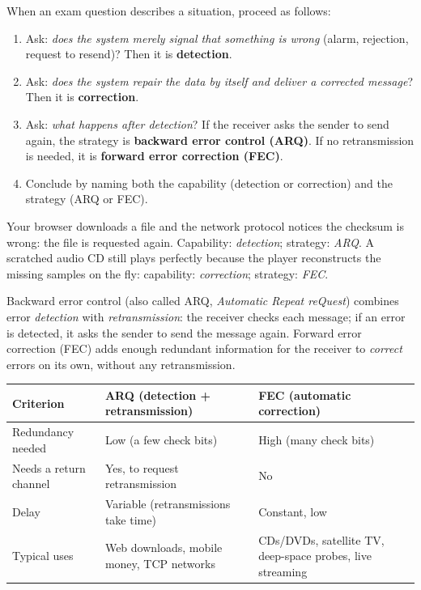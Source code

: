 \documentclass[11pt]{article}
\newcommand{\cle}[1]{{\popxbold\color{popdark}#1}}
\newcounter{popsec}
\newcounter{popsub}
\newcommand{\courssub}[1]{%
  \stepcounter{popsub}%
  \par\vspace{9pt}\noindent{\popxbold\fontsize{11.5}{13}\selectfont\color{popink}{\color{poporange}\thepopsec.\thepopsub}\hspace{6pt}#1}\par\nopagebreak\vspace{4pt}
}
\begin{document}
\begin{methode}
When an exam question describes a situation, proceed as follows:
\begin{enumerate}
\item Ask: \emph{does the system merely signal that something is wrong} (alarm, rejection, request to resend)? Then it is \textbf{detection}.
\item Ask: \emph{does the system repair the data by itself and deliver a corrected message}? Then it is \textbf{correction}.
\item Ask: \emph{what happens after detection}? If the receiver asks the sender to send again, the strategy is \textbf{backward error control (ARQ)}. If no retransmission is needed, it is \textbf{forward error correction (FEC)}.
\item Conclude by naming both the capability (detection or correction) and the strategy (ARQ or FEC).
\end{enumerate}
\end{methode}

\begin{exemplebox}
Your browser downloads a file and the network protocol notices the checksum is wrong: the file is requested again. Capability: \emph{detection}; strategy: \emph{ARQ}. A scratched audio CD still plays perfectly because the player reconstructs the missing samples on the fly: capability: \emph{correction}; strategy: \emph{FEC}.
\end{exemplebox}

\courssub{Two General Strategies: ARQ and FEC}

\begin{definition}
\cle{Backward error control} (also called \cle{ARQ}, \emph{Automatic Repeat reQuest}) combines error \emph{detection} with \emph{retransmission}: the receiver checks each message; if an error is detected, it asks the sender to send the message again. \cle{Forward error correction} (\cle{FEC}) adds enough redundant information for the receiver to \emph{correct} errors on its own, without any retransmission.
\end{definition}

\begin{center}
\begin{tabularx}{\linewidth}{|l|X|X|}
\hline
\rowcolor{popblueL} \textbf{Criterion} & \textbf{ARQ (detection + retransmission)} & \textbf{FEC (automatic correction)} \\
\hline
Redundancy needed & Low (a few check bits) & High (many check bits) \\
\hline
Needs a return channel & Yes, to request retransmission & No \\
\hline
Delay & Variable (retransmissions take time) & Constant, low \\
\hline
Typical uses & Web downloads, mobile money, TCP networks & CDs/DVDs, satellite TV, deep-space probes, live streaming \\
\hline
\end{tabularx}
\end{center}
\end{document}
